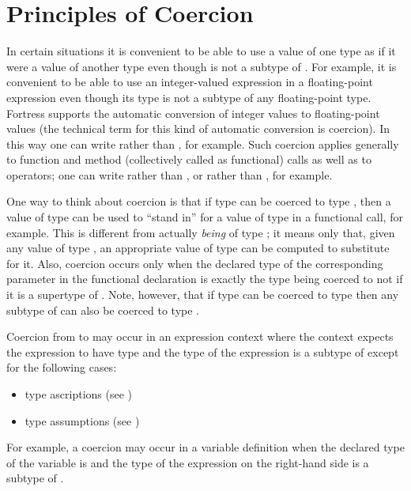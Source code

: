 \section{Principles of Coercion}

In certain situations it is convenient to be able to use a value of
one type  as if it were a value of another type  even
though  is not a subtype of .  For example, it is
convenient to be able to use an integer-valued expression
in a floating-point expression even though its
type is not a subtype of any floating-point type.  Fortress supports
the automatic conversion of integer values to floating-point values (the
technical term for this kind of automatic conversion is coercion).  In
this way one can write  rather than , for example.  Such coercion applies generally to function
and method (collectively called as functional) calls as well as to
operators; one can write  rather than , or
 rather than , for example.

One way to think about coercion is that if type  can be coerced
to type , then a value of type  can be used to ``stand
in'' for a value of type  in a functional call, for example.  This is
different from actually \emph{being} of type ; it means only
that, given any value of type , an appropriate value of type
 can be computed to substitute for it.  Also, coercion occurs
only when the declared type of the corresponding parameter in the
functional declaration is exactly the type  being coerced to
 not if it is a supertype of .  Note, however, that if type
  can be coerced to type  then any subtype of 
 can also be coerced to type .

Coercion from  to  may occur in an expression context
where the context expects the expression to have type  and
the type of the expression is a subtype of  except for the following
cases:
\begin{itemize}
\item type ascriptions (see )
\item type assumptions (see )
\end{itemize}
For example, a coercion may occur in a variable definition when the
declared type of the variable is  and the type of the expression on
the right-hand side is a subtype of .


